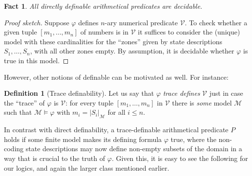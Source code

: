 \documentclass[12pt,oneside,reqno]{amsart}
\newtheorem{fact}{Fact}
\theoremstyle{definition}
\newtheorem{definition}{Definition}
\begin{document}
\begin{fact} All directly definable arithmetical predicates are decidable. \label{fact1} \end{fact}

\begin{proof}[Proof sketch] Suppose $\varphi$ defines $n$-ary numerical predicate $\mathcal{V}$. To check whether a given tuple $[m_1,\dots,m_n]$ of numbers is in $\mathcal{V}$ it suffices to consider the (unique) model with these cardinalities for the ``zones'' given by state descriptions $S_1,\dots,S_n$, with all other zones empty. By assumption, it is decidable  whether $\varphi$ is true in this model. %
\end{proof}


 However, other notions of definable can be motivated as well. For instance:
 \begin{definition}[Trace definability] \label{def:trace} Let us say that $\varphi$ \emph{trace defines} $\mathcal{V}$ just in case the ``trace'' of $\varphi$ is $\mathcal{V}$: for every tuple $[m_1,\dots,m_n]$ in $\mathcal{V}$ there is \emph{some} model $\mathcal{M}$ such that $\mathcal{M} \vDash \varphi$ with $m_i = |S_i|_{\mathcal{M}}$ for all $i \leq n$. \end{definition} %
 In contrast with direct definability, a trace-definable arithmetical predicate $P$ holds if some finite model makes its defining formula $\varphi$ true, where the non-coding state descriptions may now define non-empty subsets of the domain in a way that is crucial to the truth of $\varphi$. Given this, it is easy to see the following for our logics, and again the larger class mentioned earlier.
\end{document}
